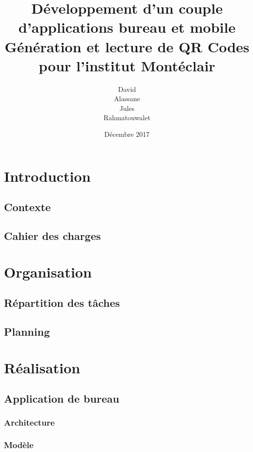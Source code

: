\documentclass{report}
\title{%
		Développement d'un couple d'applications bureau et mobile\\ \large
		Génération et lecture de QR Codes pour l'institut Montéclair}
\author{David \bsc{Dembele}\\ Alassane \bsc{Diop}\\
		Jules \bsc{Leguy}\\ Rahmatouwalet \bsc{Mohamedoun}}
\date{Décembre 2017}
\begin{document}
\maketitle

\tableofcontents

\chapter{Introduction}

	\section{Contexte}
		
	
	\section{Cahier des charges}
		

\chapter{Organisation}

	\section{Répartition des tâches}
		
	
	\section{Planning}
		

\chapter{Réalisation}

	\section{Application de bureau}

		\subsection{Architecture}
			

		\subsection{Modèle}
			
\end{document}
